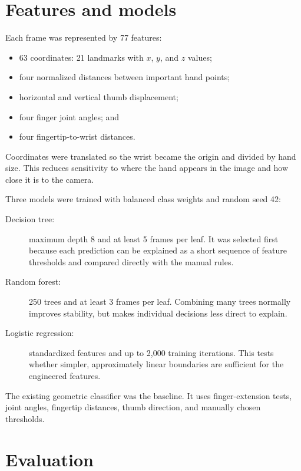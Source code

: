 \documentclass[11pt,a4paper]{article}
\begin{document}
\section{Features and models}

Each frame was represented by 77 features:

\begin{itemize}
  \item 63 coordinates: 21 landmarks with $x$, $y$, and $z$ values;
  \item four normalized distances between important hand points;
  \item horizontal and vertical thumb displacement;
  \item four finger joint angles; and
  \item four fingertip-to-wrist distances.
\end{itemize}

Coordinates were translated so the wrist became the origin and divided by hand
size. This reduces sensitivity to where the hand appears in the image and how
close it is to the camera.

Three models were trained with balanced class weights and random seed 42:

\begin{description}
  \item[Decision tree:] maximum depth 8 and at least 5 frames per leaf. It was
  selected first because each prediction can be explained as a short sequence
  of feature thresholds and compared directly with the manual rules.

  \item[Random forest:] 250 trees and at least 3 frames per leaf. Combining many
  trees normally improves stability, but makes individual decisions less direct
  to explain.

  \item[Logistic regression:] standardized features and up to 2,000 training
  iterations. This tests whether simpler, approximately linear boundaries are
  sufficient for the engineered features.
\end{description}

The existing geometric classifier was the baseline. It uses finger-extension
tests, joint angles, fingertip distances, thumb direction, and manually chosen
thresholds.

\section{Evaluation}
\end{document}
